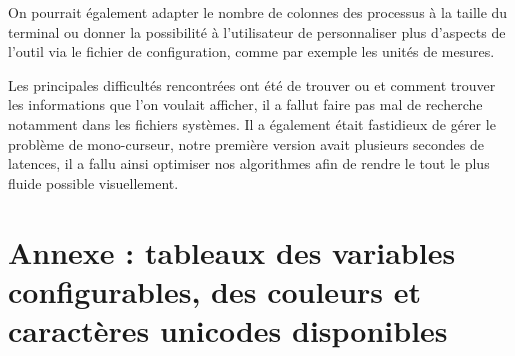 \documentclass{article}
\begin{document}
On pourrait également adapter le nombre de colonnes des processus à la taille du terminal ou donner la possibilité à l'utilisateur de personnaliser plus d'aspects de l'outil via le fichier de configuration, comme par exemple les unités de mesures.
\vspace{1em}
  
Les principales difficultés rencontrées ont été de trouver ou et comment trouver les informations que l'on voulait afficher, il a fallut faire pas mal de recherche notamment dans les fichiers systèmes.
Il a également était fastidieux de gérer le problème de mono-curseur, notre première version avait plusieurs secondes de latences, il a fallu ainsi optimiser nos algorithmes afin de rendre le tout le plus fluide possible visuellement.


\newpage
\section{Annexe : tableaux des variables configurables, des couleurs et caractères unicodes disponibles}
\vspace{3em}
\end{document}
